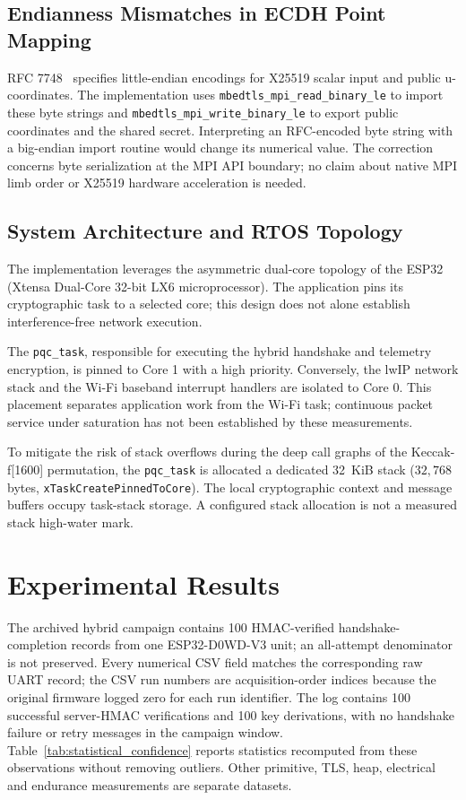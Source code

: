 \documentclass[journal, 10pt]{IEEEtran}
\begin{document}
\subsection{Endianness Mismatches in ECDH Point Mapping}
RFC 7748~\cite{b19} specifies little-endian encodings for X25519 scalar input and public u-coordinates. The implementation uses \texttt{mbedtls\_mpi\_read\_binary\_le} to import these byte strings and \texttt{mbedtls\_mpi\_write\_binary\_le} to export public coordinates and the shared secret. Interpreting an RFC-encoded byte string with a big-endian import routine would change its numerical value. The correction concerns byte serialization at the MPI API boundary; no claim about native MPI limb order or X25519 hardware acceleration is needed.

\subsection{System Architecture and RTOS Topology}
The implementation leverages the asymmetric dual-core topology of the ESP32 (Xtensa Dual-Core 32-bit LX6 microprocessor). The application pins its cryptographic task to a selected core; this design does not alone establish interference-free network execution.

The \texttt{pqc\_task}, responsible for executing the hybrid handshake and telemetry encryption, is pinned to Core 1 with a high priority. Conversely, the lwIP network stack and the Wi-Fi baseband interrupt handlers are isolated to Core 0. This placement separates application work from the Wi-Fi task; continuous packet service under saturation has not been established by these measurements.

To mitigate the risk of stack overflows during the deep call graphs of the Keccak-f[1600] permutation, the \texttt{pqc\_task} is allocated a dedicated 32~KiB stack ($32{,}768$ bytes, \texttt{xTaskCreatePinnedToCore}). The local cryptographic context and message buffers occupy task-stack storage. A configured stack allocation is not a measured stack high-water mark.

\section{Experimental Results}
The archived hybrid campaign contains 100 HMAC-verified handshake-completion records from one ESP32-D0WD-V3 unit; an all-attempt denominator is not preserved. Every numerical CSV field matches the corresponding raw UART record; the CSV run numbers are acquisition-order indices because the original firmware logged zero for each run identifier. The log contains 100 successful server-HMAC verifications and 100 key derivations, with no handshake failure or retry messages in the campaign window. Table~\ref{tab:statistical_confidence} reports statistics recomputed from these observations without removing outliers. Other primitive, TLS, heap, electrical and endurance measurements are separate datasets.
\end{document}
